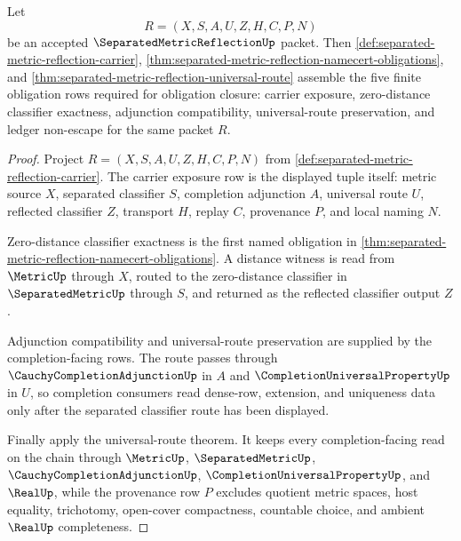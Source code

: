 \begin{theorem}
\label{thm:separated-metric-reflection-obligation-closure-package}
Let
$$
R=(X,S,A,U,Z,H,C,P,N)
$$
be an accepted $\SeparatedMetricReflectionUp$ packet. Then \autoref{def:separated-metric-reflection-carrier}, \autoref{thm:separated-metric-reflection-namecert-obligations}, and \autoref{thm:separated-metric-reflection-universal-route} assemble the five finite obligation rows required for obligation closure: carrier exposure, zero-distance classifier exactness, adjunction compatibility, universal-route preservation, and ledger non-escape for the same packet $R$.
\end{theorem}
\begin{proof}
Project $R=(X,S,A,U,Z,H,C,P,N)$ from \autoref{def:separated-metric-reflection-carrier}. The carrier exposure row is the displayed tuple itself: metric source $X$, separated classifier $S$, completion adjunction $A$, universal route $U$, reflected classifier $Z$, transport $H$, replay $C$, provenance $P$, and local naming $N$.

Zero-distance classifier exactness is the first named obligation in \autoref{thm:separated-metric-reflection-namecert-obligations}. A distance witness is read from $\MetricUp$ through $X$, routed to the zero-distance classifier in $\SeparatedMetricUp$ through $S$, and returned as the reflected classifier output $Z$.

Adjunction compatibility and universal-route preservation are supplied by the completion-facing rows. The route passes through $\CauchyCompletionAdjunctionUp$ in $A$ and $\CompletionUniversalPropertyUp$ in $U$, so completion consumers read dense-row, extension, and uniqueness data only after the separated classifier route has been displayed.

Finally apply the universal-route theorem. It keeps every completion-facing read on the chain through $\MetricUp$, $\SeparatedMetricUp$, $\CauchyCompletionAdjunctionUp$, $\CompletionUniversalPropertyUp$, and $\RealUp$, while the provenance row $P$ excludes quotient metric spaces, host equality, trichotomy, open-cover compactness, countable choice, and ambient $\RealUp$ completeness.
\end{proof}

